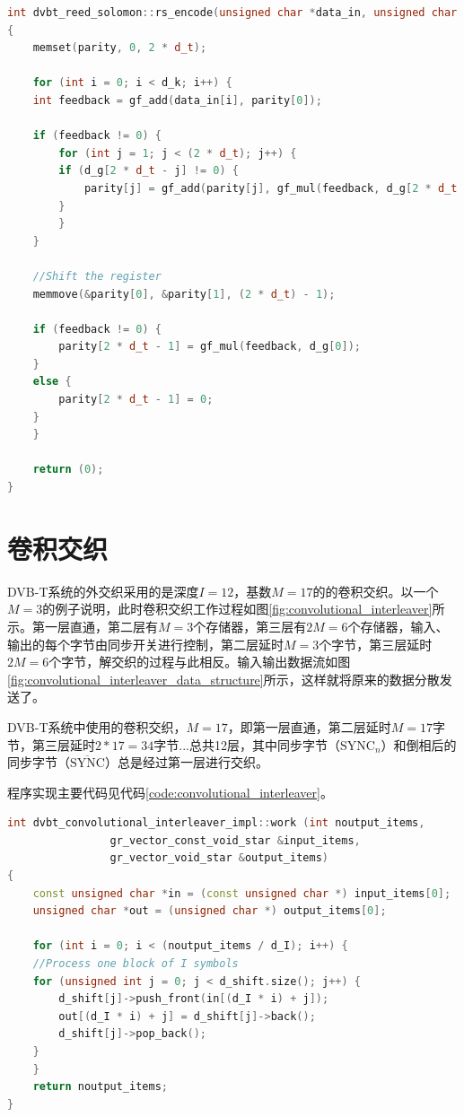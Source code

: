 		\begin{lstlisting}[caption = {RS编码}, label = {code:rs_encode}, language = C++ ]
int dvbt_reed_solomon::rs_encode(unsigned char *data_in, unsigned char *parity)
{
	memset(parity, 0, 2 * d_t);

	for (int i = 0; i < d_k; i++) {
	int feedback = gf_add(data_in[i], parity[0]);

	if (feedback != 0) {
		for (int j = 1; j < (2 * d_t); j++) {
		if (d_g[2 * d_t - j] != 0) {
			parity[j] = gf_add(parity[j], gf_mul(feedback, d_g[2 * d_t - j]));
		}
		}
	}

	//Shift the register
	memmove(&parity[0], &parity[1], (2 * d_t) - 1);

	if (feedback != 0) {
		parity[2 * d_t - 1] = gf_mul(feedback, d_g[0]);
	}
	else {
		parity[2 * d_t - 1] = 0;
	}
	}

	return (0);
}
		\end{lstlisting}
	\section{卷积交织}
		\par DVB-T系统的外交织采用的是深度$I=12$，基数$M=17$的的卷积交织。以一个$M=3$的例子说明，此时卷积交织工作过程如图\ref{fig:convolutional_interleaver}所示。第一层直通，第二层有$M=3$个存储器，第三层有$2M=6$个存储器，输入、输出的每个字节由同步开关进行控制，第二层延时$M=3$个字节，第三层延时$2M=6$个字节，解交织的过程与此相反。输入输出数据流如图\ref{fig:convolutional_interleaver_data_structure}所示，这样就将原来的数据分散发送了。
		
		
		\par DVB-T系统中使用的卷积交织，$M=17$，即第一层直通，第二层延时$M=17$字节，第三层延时$2*17=34$字节...总共12层，其中同步字节（$\text{SYNC}_n$）和倒相后的同步字节（$\overline{\text{SYNC}}$）总是经过第一层进行交织。
		\par 程序实现主要代码见代码\ref{code:convolutional_interleaver}。
		\begin{lstlisting}[caption = {卷积交织},label = {code:convolutional_interleaver},language = C++ ]
int dvbt_convolutional_interleaver_impl::work (int noutput_items,
				gr_vector_const_void_star &input_items,
				gr_vector_void_star &output_items)
{
	const unsigned char *in = (const unsigned char *) input_items[0];
	unsigned char *out = (unsigned char *) output_items[0];

	for (int i = 0; i < (noutput_items / d_I); i++) {
	//Process one block of I symbols
	for (unsigned int j = 0; j < d_shift.size(); j++) {
		d_shift[j]->push_front(in[(d_I * i) + j]);
		out[(d_I * i) + j] = d_shift[j]->back();
		d_shift[j]->pop_back();
	}
	}
	return noutput_items;
}
		\end{lstlisting}

